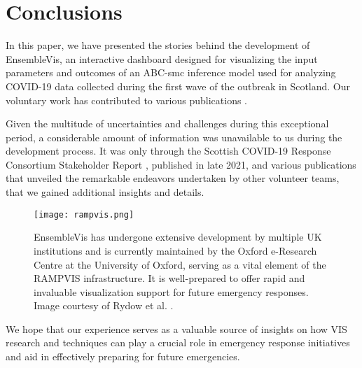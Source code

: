 \section{Conclusions}

In this paper, we have presented the stories behind the development of EnsembleVis, an interactive dashboard designed for visualizing the input parameters and outcomes of an ABC-smc inference model used for analyzing COVID-19 data collected during the first wave of the outbreak in Scotland. Our voluntary work has contributed to various publications \cite{chen2022RAMPVIS,dykes2022Visualizationb,khan2022Propagating,khan2022Rapid,rydow2023RAMPVIS}.

Given the multitude of uncertainties and challenges during this exceptional period, a considerable amount of information was unavailable to us during the development process. It was only through the Scottish COVID-19 Response Consortium Stakeholder Report \cite{abdalla2021Scottish}, published in late 2021, and various publications that unveiled the remarkable endeavors undertaken by other volunteer teams, that we gained additional insights and details.

\begin{figure}[tb!]
    \centering
    \texttt{[image: rampvis.png]}
    \caption{EnsembleVis has undergone extensive development by multiple UK institutions and is currently maintained by the Oxford e-Research Centre at the University of Oxford, serving as a vital element of the RAMPVIS infrastructure. It is well-prepared to offer rapid and invaluable visualization support for future emergency responses. Image courtesy of Rydow et al. \cite{rydow2023RAMPVIS}.
    }
    \label{fig:rampvis}

\end{figure}

We hope that our experience serves as a valuable source of insights on how VIS research and techniques can play a crucial role in emergency response initiatives and aid in effectively preparing for future emergencies.